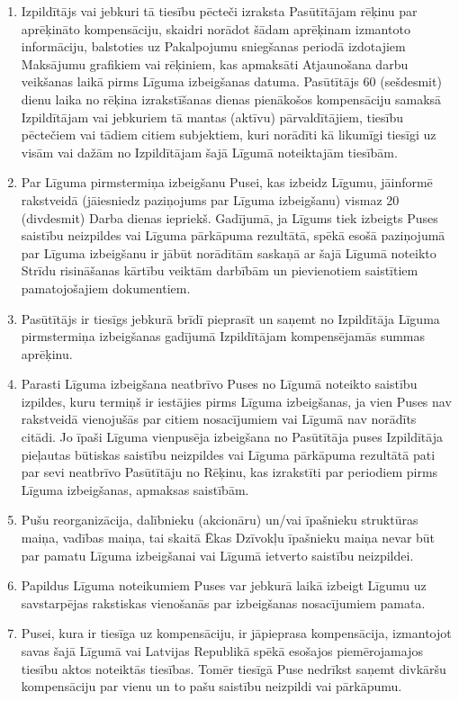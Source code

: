 \begin{multicols}{2}
\begin{enumerate}
\begin{enumerate}
	\end{enumerate}
	\item Izpildītājs vai jebkuri tā tiesību pēcteči izraksta Pasūtītājam rēķinu par aprēķināto kompensāciju, skaidri norādot šādam aprēķinam izmantoto informāciju, balstoties uz Pakalpojumu sniegšanas periodā izdotajiem Maksājumu grafikiem vai rēķiniem, kas apmaksāti Atjaunošana darbu veikšanas laikā pirms Līguma izbeigšanas datuma. Pasūtītājs 60 (sešdesmit) dienu laika no rēķina izrakstīšanas dienas pienākošos kompensāciju samaksā Izpildītājam vai jebkuriem tā mantas (aktīvu) pārvaldītājiem, tiesību pēctečiem vai tādiem citiem subjektiem, kuri norādīti kā likumīgi tiesīgi uz visām vai dažām no Izpildītājam šajā Līgumā noteiktajām tiesībām.
	\item Par Līguma pirmstermiņa izbeigšanu Pusei, kas izbeidz Līgumu, jāinformē rakstveidā (jāiesniedz paziņojums par Līguma izbeigšanu) vismaz 20 (divdesmit) Darba dienas iepriekš. Gadījumā, ja Līgums tiek izbeigts Puses saistību neizpildes vai Līguma pārkāpuma rezultātā, spēkā esošā paziņojumā par Līguma izbeigšanu ir jābūt norādītām saskaņā ar šajā Līgumā noteikto Strīdu risināšanas kārtību veiktām darbībām un pievienotiem saistītiem pamatojošajiem dokumentiem.
	\item Pasūtītājs ir tiesīgs jebkurā brīdī pieprasīt un saņemt no Izpildītāja Līguma pirmstermiņa izbeigšanas gadījumā Izpildītājam kompensējamās summas aprēķinu.
	\item Parasti Līguma izbeigšana neatbrīvo Puses no Līgumā noteikto saistību izpildes, kuru termiņš ir iestājies pirms Līguma izbeigšanas, ja vien Puses nav rakstveidā vienojušās par citiem nosacījumiem vai Līgumā nav norādīts citādi. Jo īpaši Līguma vienpusēja izbeigšana no Pasūtītāja puses Izpildītāja pieļautas būtiskas saistību neizpildes vai Līguma pārkāpuma rezultātā pati par sevi neatbrīvo Pasūtītāju no Rēķinu, kas izrakstīti par periodiem pirms Līguma izbeigšanas, apmaksas saistībām.
	\item Pušu reorganizācija, dalībnieku (akcionāru) un/vai īpašnieku struktūras maiņa, vadības maiņa, tai skaitā Ēkas Dzīvokļu īpašnieku maiņa nevar būt par pamatu Līguma izbeigšanai vai Līgumā ietverto saistību neizpildei.
	\item Papildus Līguma noteikumiem Puses var jebkurā laikā izbeigt Līgumu uz savstarpējas rakstiskas vienošanās par izbeigšanas nosacījumiem pamata.
	\item Pusei, kura ir tiesīga uz kompensāciju, ir jāpieprasa kompensācija, izmantojot savas šajā Līgumā vai Latvijas Republikā spēkā esošajos piemērojamajos tiesību aktos noteiktās tiesības. Tomēr tiesīgā Puse nedrīkst saņemt divkāršu kompensāciju par vienu un to pašu saistību neizpildi vai pārkāpumu.

\end{enumerate}
\end{multicols}
